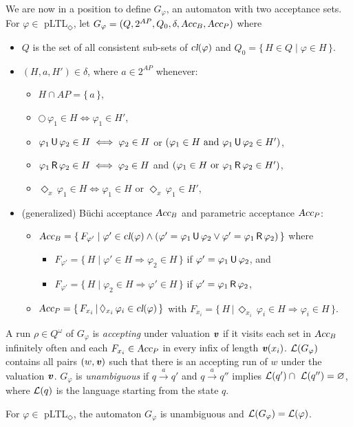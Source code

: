 \documentclass{llncs}
\def\Acc{\mbox{\sl Acc}}
\newcommand{\cl}{\mbox{\sl cl}}
\newcommand{\set}[1]{\{ \, #1 \, \}}
\newcommand{\Next}{\bigcirc \, }
\newcommand{\Until}{\mbox{$\, {\sf U}\,$}}
\newcommand{\R}{\mbox{$\, {\sf R}\,$}}
\newcommand{\U}{\Until}
\newcommand{\Release}{\mbox{$\, {\sf R}\,$}}
\newcommand{\X}{\Next}
\renewcommand{\L}{{\cal L}}
\renewcommand{\emptyset}{\varnothing}
\renewcommand{\a}[1]{\textbf{\textit{#1}}}
\newcommand{\ve}{{{\a v}}}
\newcommand{\de}{\Diamond}
\begin{document}
\noindent
We are now in a position to define $G_\varphi$, an automaton with two acceptance sets.
For $\varphi \in$ pLTL$_\de$, let $G_\varphi= (Q,2^{AP},Q_0,\delta,\Acc_B,\Acc_P)$ where
 \begin{itemize}
  \item $Q$ is the set of all consistent sub-sets of  $\cl(\varphi)$  and $Q_0 = \set{H \in Q \mid \varphi \in H}$.
  \item $(H,a,H')\in \delta$, where $a \in 2^{AP}$ whenever:
\begin{itemize}
   \item $H \cap AP = \set{a}$,
   \item $\X\! \varphi_1\in H \iff \varphi_1 \in H'$,
   \item $\varphi_1\U\varphi_2 \in H \iff \varphi_2 \in H$ or $(\varphi_1\in H \mbox{ and } \varphi_1\U\varphi_2 \in H')$,
   \item $\varphi_1\Release\varphi_2 \in H \iff \varphi_2 \in H$ and $(\varphi_1\in H \mbox{ or } \varphi_1\Release\varphi_2 \in H')$,
   \item $\de_{x} \, \varphi_1 \in H \iff \varphi_1 \in H$ or $\de_{ x} \, \varphi_1 \in H'$,
  \end{itemize}
\item (generalized) B\"uchi acceptance $\Acc_B$ and parametric acceptance $\Acc_P$:
  \begin{itemize}
\item $\Acc_B = \set{F_{\varphi'} \mid \varphi' \in \cl(\varphi) \wedge (\varphi' = \varphi_1{\U}\varphi_2 
             \vee \varphi' = \varphi_1{\R}\varphi_2)}$ where
      \begin{itemize}
      \item 
      $F_{\varphi'} = \set{H \mid \varphi' \in H \Rightarrow \varphi_2 \in H}$ if $\varphi' = \varphi_1 \U \varphi_2$, and
      \item
      $F_{\varphi'} = \set{H \mid \varphi_2 \in H \Rightarrow \varphi' \in H}$ if $\varphi' = \varphi_1 \R \varphi_2$,
      \end{itemize}
\item $\Acc_P = \set{F_{{x_i}} \, | \, \de_{x_i} \, \varphi_i \in \cl(\varphi)}$ with $F_{{x_i}}  = \set{H \, | \, \de_{x_i} \, \varphi_i \in H \Rightarrow \varphi_i \in H}$. 
  \end{itemize}
 \end{itemize}
  A run $\rho \in Q^\omega$ of $G_\varphi$ 
  is \emph{accepting} under valuation $\ve$ if it visits each set in $\Acc_B$ infinitely often and each $F_{x_i} \in \Acc_P$ 
  in every infix of length $\ve(x_i)$.
  $\L(G_\varphi )$ contains all pairs $(w,\ve)$ such that there is an accepting run of $w$ under the valuation $\ve$. 
$G_\varphi$ is \emph{unambiguous} if $q \xrightarrow{a} q'$ and $q\xrightarrow{a}q''$ implies $\L(q') \cap \ \L(q'')=\emptyset$, where $\L(q)$ is the language starting from the state $q$.
\begin{proposition}
For $\varphi \in$ pLTL$_\de$, the automaton $G_\varphi $ is unambiguous and $\L(G_\varphi ) = \L(\varphi)$.
\end{proposition}
\end{document}
